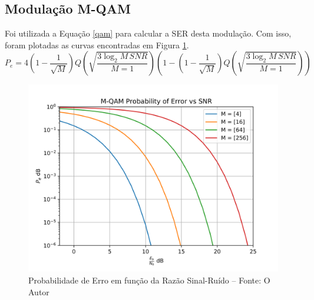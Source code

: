 \documentclass[10pt,two column,a4paper]{article}
\begin{document}
	\subsection{Modulação M-QAM}
	Foi utilizada a Equação \eqref{qam} para calcular a SER desta modulação. Com isso, foram plotadas as curvas encontradas em Figura \ref{qamI}.
	\begin{dmath}
	P_e  = 4\left(1-\frac{1}{\sqrt{M}} \right) Q\left( \sqrt{\frac{3\log_2M\,SNR}{M=1}} \right)\left(1-\left(1-\frac{1}{\sqrt{M}}\right) Q\left( \sqrt{\frac{3\log_2M\,SNR}{M=1}} \right) \right)
	\label{qam}
	\end{dmath}
	\begin{figure}[h]\centering
		\includegraphics[width=\linewidth]{imagens_ex1/qam.png}\caption{Probabilidade de Erro em função da Razão Sinal-Ruído -- Fonte: O Autor}\label{qamI}
	\end{figure}
\end{document}
